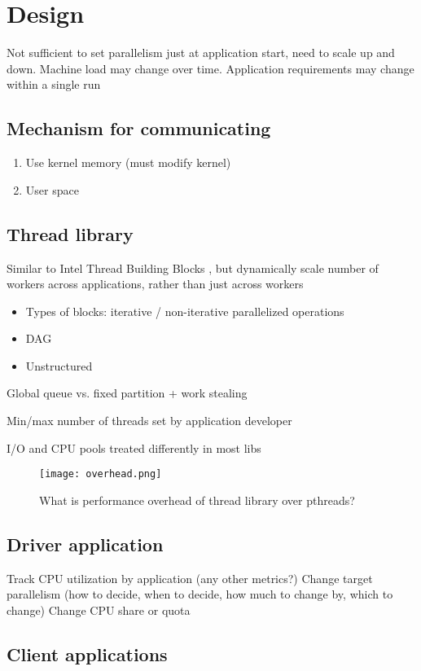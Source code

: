 \section{Design}
Not sufficient to set parallelism just at application start, need to scale up and down. Machine load may change over time. Application requirements may change within a single run

\subsection{Mechanism for communicating}
\begin{enumerate}
  \item Use kernel memory (must modify kernel)
  \item User space
\end{enumerate}

\subsection{Thread library}
Similar to Intel Thread Building Blocks \cite{reinders2007intel}, but dynamically scale number of workers across applications, rather than just across workers
\begin{itemize}
  \item Types of blocks: iterative / non-iterative parallelized operations
  \item DAG
  \item Unstructured
\end{itemize}

Global queue vs. fixed partition + work stealing

Min/max number of threads set by application developer

I/O and CPU pools treated differently in most libs

\begin{figure}
\centering
  \texttt{[image: overhead.png]}
  \caption{What is performance overhead of thread library over pthreads?}
\end{figure}
\subsection{Driver application}
Track CPU utilization by application (any other metrics?)
Change target parallelism (how to decide, when to decide, how much to change by, which to change)
Change CPU share or quota
\subsection{Client applications}
